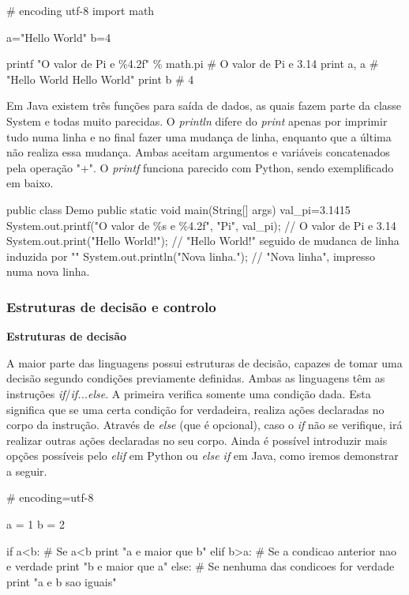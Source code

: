 \documentclass[11pt,openright,twoside]{report}
\begin{document}
\begin{Python}
# encoding utf-8
import math

a="Hello World"
b=4

printf "O valor de Pi e \%4.2f" \% math.pi 	# O valor de Pi e 3.14
print a, a									# "Hello World Hello World"
print b										# 4
\end{Python}

Em Java existem três funções para saída de dados, as quais fazem parte da classe System e todas muito parecidas. O \textit{println} difere do \textit{print} apenas por imprimir tudo numa linha e no final fazer uma mudança de linha, enquanto que a última não realiza essa mudança. Ambas aceitam argumentos e variáveis concatenados pela operação "+". O \textit{printf} funciona parecido com Python, sendo exemplificado em baixo.

\begin{Java}
public class Demo{
	public static void main(String[] args){
		val_pi=3.1415
		System.out.printf("O valor de \%s e \%4.2f", "Pi", val_pi);
		// O valor de Pi e 3.14
		System.out.print("Hello World!\n");
		// "Hello World!" seguido de mudanca de linha induzida por "\n"
		System.out.println("Nova linha.");
		// "Nova linha", impresso numa nova linha.
	}
}
\end{Java}
\medskip

\subsubsection{Estruturas de decisão e controlo}
\medskip

\textbf{Estruturas de decisão}
\smallskip

A maior parte das linguagens possui estruturas de decisão, capazes de tomar uma decisão segundo condições previamente definidas. Ambas as linguagens têm as instruções \textit{if}/\textit{if...else}. A primeira verifica somente uma condição dada. Esta significa que se uma certa condição for verdadeira, realiza ações declaradas no corpo da instrução. Através de \textit{else} (que é opcional), caso o \textit{if} não se verifique, irá realizar outras ações declaradas no seu corpo. Ainda é possível introduzir mais opções possíveis pelo \textit{elif} em Python ou \textit{else if} em Java, como iremos demonstrar a seguir.

\smallskip
\begin{Python}
# encoding=utf-8

a = 1
b = 2

if a<b:					# Se a<b
	print "a e maior que b"
elif b>a:					# Se a condicao anterior nao e verdade
	print "b e maior que a"
else:						# Se nenhuma das condicoes for verdade
	print "a e b sao iguais"
\end{Python}
\smallskip
\end{document}
